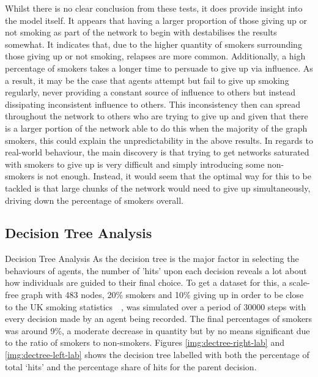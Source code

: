 \documentclass[]{report}
\begin{document}
Whilst there is no clear conclusion from these tests, it does provide insight into the model itself. It appears that having a larger proportion of those giving up or not smoking as part of the network to begin with destabilises the results somewhat. It indicates that, due to the higher quantity of smokers surrounding those giving up or not smoking, relapses are more common. Additionally, a high percentage of smokers takes a longer time to persuade to give up via influence. As a result, it may be the case that agents attempt but fail to give up smoking regularly, never providing a constant source of influence to others but instead dissipating inconsistent influence to others. This inconsistency then can spread throughout the network to others who are trying to give up and given that there is a larger portion of the network able to do this when the majority of the graph smokers, this could explain the unpredictability in the above results. In regards to real-world behaviour, the main discovery is that trying to get networks saturated with smokers to give up is very difficult and simply introducing some non-smokers is not enough. Instead, it would seem that the optimal way for this to be tackled is that large chunks of the network would need to give up simultaneously, driving down the percentage of smokers overall.


\subsection{Decision Tree Analysis}
Decision Tree Analysis
As the decision tree is the major factor in selecting the behaviours of agents, the number of 'hits' upon each decision reveals a lot about how individuals are guided to their final choice. To get a dataset for this, a scale-free graph with 483 nodes, 20\% smokers and 10\% giving up in order to be close to the UK smoking statistics~\cite{NHS-12}~\cite{NHS-43}, was simulated over a period of 30000 steps with every decision made by an agent being recorded. The final percentages of smokers was around 9\%, a moderate decrease in quantity but by no means significant due to the ratio of smokers to non-smokers. Figures \ref{img:dectree-right-lab} and \ref{img:dectree-left-lab}  shows the decision tree labelled with both the percentage of total `hits' and the percentage share of hits for the parent decision.
\end{document}
